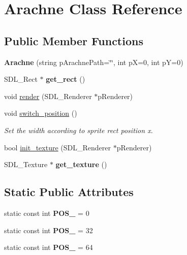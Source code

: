 \hypertarget{classArachne}{}\section{Arachne Class Reference}
\label{classArachne}
\subsection*{Public Member Functions}
\begin{DoxyCompactItemize}
\item 
\mbox{\label{classArachne_a82dc10fe561f5339dc20ce5d84648c71}} 
{\bfseries Arachne} (string p\+Arachne\+Path=\char`\"{}\char`\"{}, int pX=0, int pY=0)
\item 
\mbox{\label{classArachne_a12c0b5fb98bacc8a1223ccb23154bd32}} 
S\+D\+L\+\_\+\+Rect $\ast$ {\bfseries get\+\_\+rect} ()
\item 
void \hyperlink{classArachne_afc79c16c885252e652fc4b2ffcc7a3a2}{render} (S\+D\+L\+\_\+\+Renderer $\ast$p\+Renderer)
\item 
void \hyperlink{classArachne_a3eb4774956f6af639d99e6e92c359ca3}{switch\+\_\+position} ()
\begin{DoxyCompactList}\small\item\em Set the width according to sprite rect position x. \end{DoxyCompactList}\item 
bool \hyperlink{classArachne_aded2ad5435693781c82cefaf98796b39}{init\+\_\+texture} (S\+D\+L\+\_\+\+Renderer $\ast$p\+Renderer)
\item 
\mbox{\label{classArachne_abf67dee8028d127affe78f2584f121c0}} 
S\+D\+L\+\_\+\+Texture $\ast$ {\bfseries get\+\_\+texture} ()
\end{DoxyCompactItemize}
\subsection*{Static Public Attributes}
\begin{DoxyCompactItemize}
\item 
\mbox{\label{classArachne_af7902632fce332bfa98aabab05fee6be}} 
static const int {\bfseries P\+O\+S\+\_} = 0
\item 
\mbox{\label{classArachne_ade755e2a9dc32eb793b66be6aa0c1ec2}} 
static const int {\bfseries P\+O\+S\+\_} = 32
\item 
\mbox{\label{classArachne_a5dca70fcb9290b96873655563fb4aab3}} 
static const int {\bfseries P\+O\+S\+\_} = 64
\end{DoxyCompactItemize}


